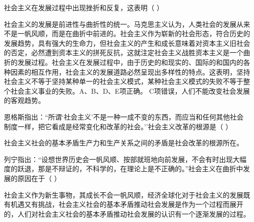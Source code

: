 \question 社会主义在发展过程中出现挫折和反复，这表明（ ）
\par{}
\begin{solution}社会主义的发展是前进性与曲折性的统一。马克思主义认为，人类社会的发展从来不是一帆风顺，而是在曲折中前进的。社会主义作为崭新的社会形态，符合历史的发展趋势，具有强大的生命力，但社会主义的产生和成长意味着对资本主义旧社会的否定，必然遭到资本主义的拼死反抗，这就注定社会主义战胜资本主义是一个曲折的发展过程。社会主义在发展过程中，由于历史的和现实的、国际的和国内的各种因素的相互作用，社会主义的发展道路必然呈现出多样性的特点。这表明，坚持社会主义不等于坚持某种单一的社会主义模式，某种社会主义模式的失败不等于整个社会主义事业的失败。A、B、D、E项正确。
C项错误，人们不能改变社会发展的客观趋势。
\end{solution}
\question 恩格斯指出：``所谓`社会主义'不是一种一成不变的东西，而应当和任何其他社会制度一样，把它看成是经常变化和改革的社会。''社会主义改革的根源是（
）
\par{}
\begin{solution}社会主义社会的基本矛盾生产力和生产关系之间的矛盾是社会改革的根源所在。
\end{solution}
\question 列宁指出：``设想世界历史会一帆风顺、按部就班地向前发展，不会有时出现大幅度的跃退，那是不辩证的，不科学的，在理论上是不正确的。''社会主义在曲折中发展的原因在于（
）
\par\fourch{\textcolor{red}{社会主义作为新生事物，其成长不会一帆风顺}}{\textcolor{red}{经济全球化对于社会主义的发展既有机遇又有挑战}}{\textcolor{red}{社会主义社会的基本矛盾推动社会发展是作为一个过程而展开的}}{\textcolor{red}{人们对社会主义社会的基本矛盾推动社会发展的认识有一个逐渐发展的过程}}
\begin{solution}社会主义作为新生事物，其成长不会一帆风顺，经济全球化对于社会主义的发展既有机遇又有挑战，社会主义社会的基本矛盾推动社会发展是作为一个过程而展开的，人们对社会主义社会的基本矛盾推动社会发展的认识有一个逐渐发展的过程。
\end{solution}
